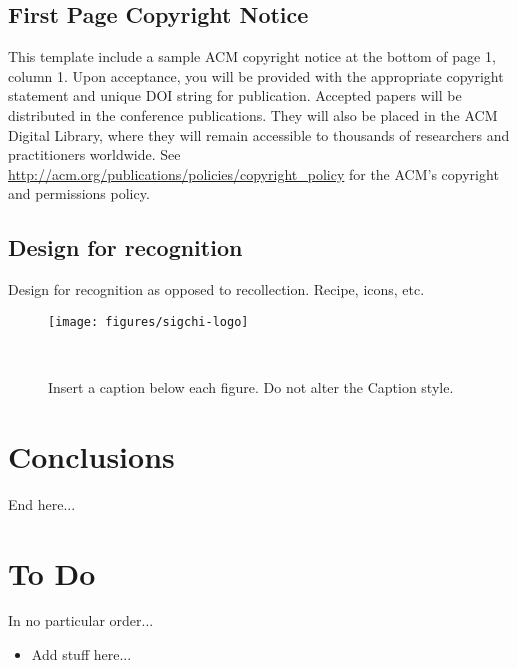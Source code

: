 \documentclass{sig-alternate}
\begin{document}
 


\subsection{First Page Copyright Notice}
This template include a sample ACM copyright notice at the bottom of
page 1, column 1.  Upon acceptance, you will be provided with the
appropriate copyright statement and unique DOI string for publication.
Accepted papers will be distributed in the conference
publications. They will also be placed in the ACM Digital Library,
where they will remain accessible to thousands of researchers and
practitioners worldwide. See
\url{http://acm.org/publications/policies/copyright_policy} for the
ACM’s copyright and permissions policy.


\subsection{Design for recognition}
Design for recognition as opposed to recollection. 
Recipe, icons, etc.
\begin{figure}
\centering
  \texttt{[image: figures/sigchi-logo]}
  \caption{Insert a caption below each figure. Do not alter the
    Caption style.}~\label{fig:figure1}
\end{figure}


\section{Conclusions}
End here...






\section*{To Do}

In no particular order...

\begin{itemize}
\item Add stuff here...
\end{itemize}
\end{document}

